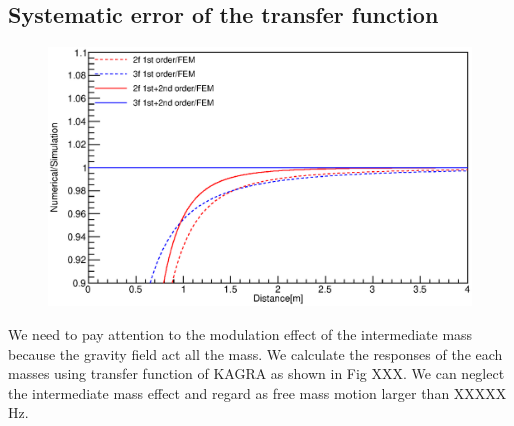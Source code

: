 \documentclass[]{spie}  %
\begin{document}
\subsection{Systematic error of the transfer function}
\begin{figure}
\begin{center}
\includegraphics[width=12cm]{dvsx_ratio.eps}
\caption{}
\label{fig:ratio}
\end{center}
\end{figure}

We need to pay attention to the modulation effect of the intermediate mass because the gravity field act all the mass. We calculate the responses of the each masses using transfer function of KAGRA as shown in Fig XXX. We can neglect the intermediate mass effect and regard as free mass motion larger than XXXXX Hz. 
\end{document}

